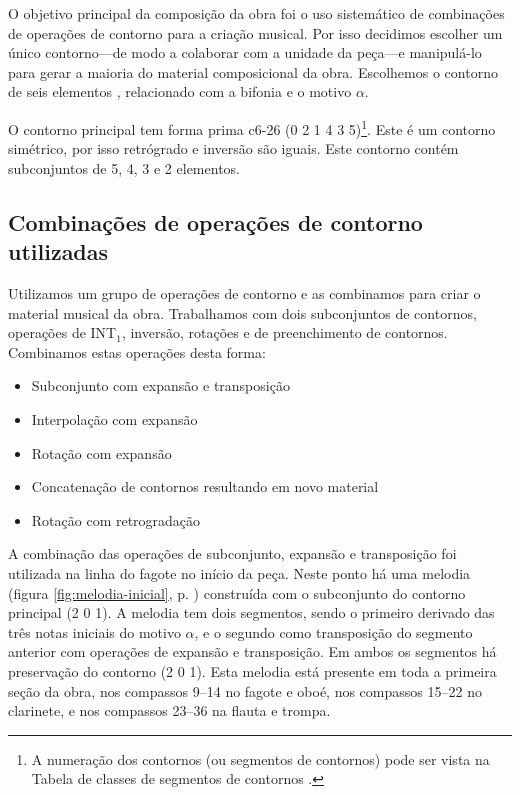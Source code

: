O objetivo principal da composição da obra \obra{} foi o uso
sistemático de combinações de operações de contorno para a criação
musical. Por isso decidimos escolher um único contorno---de modo a
colaborar com a unidade da peça---e manipulá-lo para gerar a maioria
do material composicional da obra. Escolhemos o contorno de seis
elementos \contpr{}, relacionado com a bifonia e o motivo $\alpha$.

O contorno principal \contpr{} tem forma prima c6-26 (0 2 1 4 3
5)\footnote{A numeração dos contornos (ou segmentos de contornos) pode
  ser vista na Tabela de classes de segmentos de contornos
  \cite{marvin.ea87:relating}.}. Este é um contorno simétrico, por
isso retrógrado e inversão são iguais. Este contorno contém
subconjuntos de 5, 4, 3 e 2 elementos.

\subsection{Combinações de operações de contorno utilizadas}
\label{sec:comb-de-oper}

Utilizamos um grupo de operações de contorno e as combinamos para
criar o material musical da obra. Trabalhamos com dois subconjuntos de
contornos, operações de INT$_1$, inversão, rotações e de preenchimento
de contornos. Combinamos estas operações desta forma:

\begin{itemize}
\item Subconjunto com expansão e transposição
\item Interpolação com expansão
\item Rotação com expansão
\item Concatenação de contornos resultando em novo material
\item Rotação com retrogradação
\end{itemize}




A combinação das operações de subconjunto, expansão e transposição foi
utilizada na linha do fagote no início da peça. Neste ponto há uma
melodia (figura \ref{fig:melodia-inicial},
p. \pageref{fig:melodia-inicial}) construída com o subconjunto do
contorno principal (2 0 1). A melodia tem dois segmentos, sendo o
primeiro derivado das três notas iniciais do motivo $\alpha$, e o
segundo como transposição do segmento anterior com operações de
expansão e transposição. Em ambos os segmentos há preservação do
contorno (2 0 1). Esta melodia está presente em toda a primeira seção
da obra, nos compassos 9--14 no fagote e oboé, nos compassos 15--22 no
clarinete, e nos compassos 23--36 na flauta e trompa.

